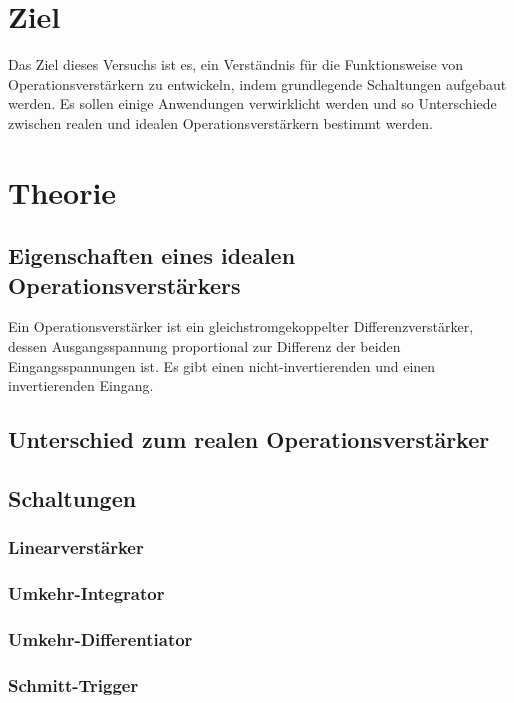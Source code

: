 \section{Ziel}
Das Ziel dieses Versuchs ist es, ein Verständnis für die Funktionsweise von Operationsverstärkern zu entwickeln, indem grundlegende Schaltungen aufgebaut werden. Es sollen einige Anwendungen verwirklicht werden und so Unterschiede zwischen realen und idealen Operationsverstärkern bestimmt werden. %


\section{Theorie}

\subsection{Eigenschaften eines idealen Operationsverstärkers}
Ein Operationsverstärker ist ein gleichstromgekoppelter Differenzverstärker, dessen Ausgangsspannung proportional zur Differenz der beiden Eingangsspannungen ist. Es gibt einen nicht-invertierenden und einen invertierenden Eingang.


\subsection{Unterschied zum realen Operationsverstärker}

\subsection{Schaltungen}
\subsubsection{Linearverstärker}

\subsubsection{Umkehr-Integrator}

\subsubsection{Umkehr-Differentiator}

\subsubsection{Schmitt-Trigger}




